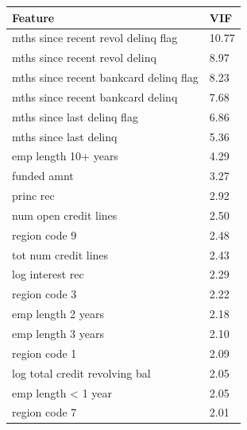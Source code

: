 \begin{tabular}{ll}
\toprule
Feature & VIF \\
\midrule
mths since recent revol delinq flag & 10.77 \\
mths since recent revol delinq & 8.97 \\
mths since recent bankcard delinq flag & 8.23 \\
mths since recent bankcard delinq & 7.68 \\
mths since last delinq flag & 6.86 \\
mths since last delinq & 5.36 \\
emp length 10+ years & 4.29 \\
funded amnt & 3.27 \\
princ rec & 2.92 \\
num open credit lines & 2.50 \\
region code 9 & 2.48 \\
tot num credit lines & 2.43 \\
log interest rec & 2.29 \\
region code 3 & 2.22 \\
emp length 2 years & 2.18 \\
emp length 3 years & 2.10 \\
region code 1 & 2.09 \\
log total credit revolving bal & 2.05 \\
emp length < 1 year & 2.05 \\
region code 7 & 2.01 \\
\bottomrule
\end{tabular}
